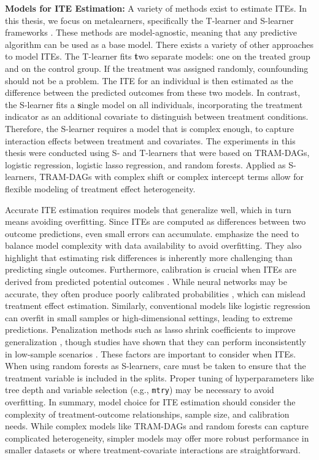 

\textbf{Models for ITE Estimation:} \label{sec:ite_models} A variety of methods exist to estimate ITEs. In this thesis, we focus on metalearners, specifically the T-learner and S-learner frameworks \citep{kunzel2019}. These methods are model-agnostic, meaning that any predictive algorithm can be used as a base model. There exists a variety of other approaches to model ITEs. The T-learner fits \textbf{t}wo separate models: one on the treated group and on the control group. If the treatment was assigned randomly, counfounding should not be a problem. The ITE for an individual is then estimated as the difference between the predicted outcomes from these two models. In contrast, the S-learner fits a \textbf{s}ingle model on all individuals, incorporating the treatment indicator as an additional covariate to distinguish between treatment conditions. Therefore, the S-learner requires a model that is complex enough, to capture interaction effects between treatment and covariates. The experiments in this thesis were conducted using S- and T-learners that were based on TRAM-DAGs, logistic regression, logistic lasso regression, and random forests. Applied as S-learners, TRAM-DAGs with complex shift or complex intercept terms allow for flexible modeling of treatment effect heterogeneity. 

Accurate ITE estimation requires models that generalize well, which in turn means avoiding overfitting. Since ITEs are computed as differences between two outcome predictions, even small errors can accumulate. \citet{hoogland2021} emphasize the need to balance model complexity with data availability to avoid overfitting. They also highlight that estimating risk differences is inherently more challenging than predicting single outcomes. Furthermore, calibration is crucial when ITEs are derived from predicted potential outcomes \citep{hoogland2024}. While neural networks may be accurate, they often produce poorly calibrated probabilities \citep{guo2017}, which can mislead treatment effect estimation. Similarly, conventional models like logistic regression can overfit in small samples or high-dimensional settings, leading to extreme predictions. Penalization methods such as lasso shrink coefficients to improve generalization \citep{riley2021}, though studies have shown that they can perform inconsistently in low-sample scenarios \citep{calster2020}. These factors are important to consider when ITEs.
When using random forests as S-learners, care must be taken to ensure that the treatment variable is included in the splits. Proper tuning of hyperparameters like tree depth and variable selection (e.g., \texttt{mtry}) may be necessary to avoid overfitting.
In summary, model choice for ITE estimation should consider the complexity of treatment-outcome relationships, sample size, and calibration needs. While complex models like TRAM-DAGs and random forests can capture complicated heterogeneity, simpler models may offer more robust performance in smaller datasets or where treatment-covariate interactions are straightforward.



